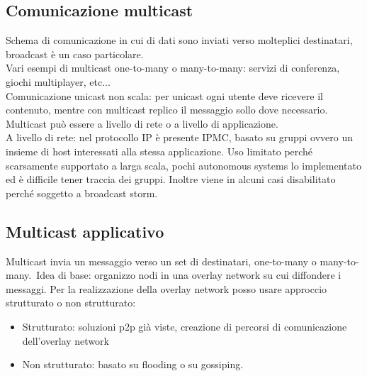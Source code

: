 \documentclass{article}
\begin{document}
\subsection{Comunicazione multicast}
Schema di comunicazione in cui di dati sono inviati verso molteplici destinatari, broadcast è un caso particolare.\\ Vari esempi di multicast one-to-many o many-to-many: servizi di conferenza, giochi multiplayer, etc...\\ Comunicazione unicast non scala: per unicast ogni utente deve ricevere il contenuto, mentre con multicast replico il messaggio sollo dove necessario.\\ Multicast può essere a livello di rete o a livello di applicazione.\\
A livello di rete: nel protocollo IP è presente IPMC, basato su gruppi ovvero un insieme di host interessati alla stessa applicazione. Uso limitato perché scarsamente supportato a larga scala, pochi autonomous systems lo implementato ed è difficile tener traccia dei gruppi. Inoltre viene in alcuni casi disabilitato perché soggetto a broadcast storm.
\subsection{Multicast applicativo}
Multicast invia un messaggio verso un set di destinatari, one-to-many o many-to-many.\ Idea di base: organizzo nodi in una overlay network su cui diffondere i messaggi. Per la realizzazione della overlay network posso usare approccio strutturato o non strutturato:
\begin{itemize}
\item Strutturato: soluzioni p2p già viste, creazione di percorsi di comunicazione dell'overlay network
\item Non strutturato: basato su flooding o su gossiping.
\end{itemize}
\end{document}
